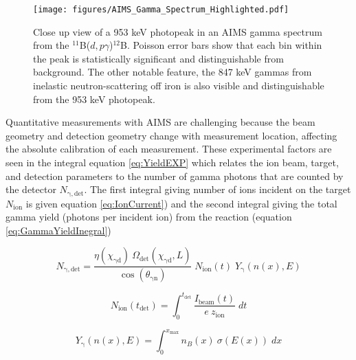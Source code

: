 \documentclass[final,3p,times,twocolumn]{elsarticle}
\begin{document}
\begin{figure}[!h]
 \centering
  \texttt{[image: figures/AIMS\_Gamma\_Spectrum\_Highlighted.pdf]}
 \caption{Close up view of a 953 keV photopeak in an AIMS gamma spectrum from the $^{11}$B($d,p\gamma$)$^{12}$B.  Poisson error bars show that each bin within the peak is statistically significant and distinguishable from background.  The other notable feature, the 847 keV gammas from inelastic neutron-scattering off iron is also visible and distinguishable from the 953 keV photopeak.}
 \label{fig:ZoomedInAIMSPhotopeak}
\end{figure}

Quantitative measurements with AIMS are challenging because the beam geometry and detection geometry change with measurement location, affecting the absolute calibration of each measurement. These experimental factors are seen in the integral equation \ref{eq:YieldEXP} which relates the ion beam, target, and detection parameters to the number of gamma photons that are counted by the detector $N_\mathrm{\gamma,det}$. The first integral giving number of ions incident on the target $N_\mathrm{ion}$ is given equation \ref{eq:IonCurrent}) and the second integral giving the total gamma yield (photons per incident ion) from the reaction (equation \ref{eq:GammaYieldInegral})

\begin{equation}
N_\mathrm{\gamma,det} = \frac{\eta(\chi_\mathrm{\gamma d}) \:\Omega_\mathrm{det}(\chi_\mathrm{\gamma d},L)}{\cos(\theta_\mathrm{\gamma n})} \; N_\mathrm{ion}(t)\;Y_\mathrm{\gamma}(n(x),E)
\label{eq:YieldEXP}
\end{equation}

\begin{equation}
N_\mathrm{ion}(t_\mathrm{det}) = \int_0^{t_\mathrm{det}} \frac{I_\mathrm{beam}(t)}{e\:z_\mathrm{ion}} \; dt
\label{eq:IonCurrent}
\end{equation}

\begin{equation}
Y_\mathrm{\gamma}(n(x),E) = \int_0^{ x_\mathrm{max}} n_B(x)\:\sigma(E(x))\;dx
\label{eq:GammaYieldInegral}
\end{equation}
\end{document}
